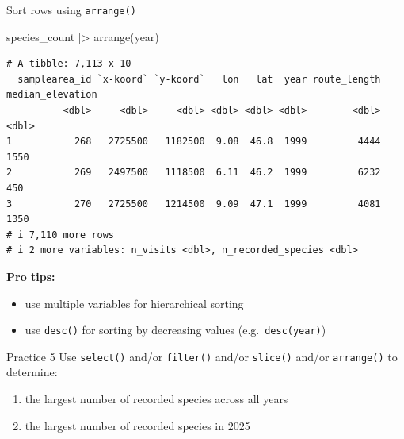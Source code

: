 \documentclass[
  ignorenonframetext,
  aspectratio=169,
]{beamer}
\newenvironment{Shaded}{\begin{snugshade}}{\end{snugshade}}
\newcommand{\FunctionTok}[1]{\textcolor[rgb]{0.28,0.35,0.67}{#1}}
\newcommand{\NormalTok}[1]{\textcolor[rgb]{0.00,0.23,0.31}{#1}}
\newcommand{\SpecialCharTok}[1]{\textcolor[rgb]{0.37,0.37,0.37}{#1}}
\providecommand{\tightlist}{%
  \setlength{\itemsep}{0pt}\setlength{\parskip}{0pt}}
\let\oldtexttt\texttt
\renewcommand{\texttt}[1]{\colorbox{gray!20}{\oldtexttt{#1}}}
\begin{document}
\begin{frame}[fragile]{Sort rows using \texttt{arrange()}}
\protect{}\label{sort-rows-using-arrange}
\footnotesize

\begin{Shaded}
\begin{Highlighting}[]
\NormalTok{species\_count }\SpecialCharTok{|\textgreater{}} \FunctionTok{arrange}\NormalTok{(year)}
\end{Highlighting}
\end{Shaded}

\begin{verbatim}
# A tibble: 7,113 x 10
  samplearea_id `x-koord` `y-koord`   lon   lat  year route_length median_elevation
          <dbl>     <dbl>     <dbl> <dbl> <dbl> <dbl>        <dbl>            <dbl>
1           268   2725500   1182500  9.08  46.8  1999         4444             1550
2           269   2497500   1118500  6.11  46.2  1999         6232              450
3           270   2725500   1214500  9.09  47.1  1999         4081             1350
# i 7,110 more rows
# i 2 more variables: n_visits <dbl>, n_recorded_species <dbl>
\end{verbatim}

\normalsize

\pause

\textbf{Pro tips:}

\begin{itemize}
\tightlist
\item
  use multiple variables for hierarchical sorting
\item
  use \texttt{desc()} for sorting by decreasing values
  (e.g.~\texttt{desc(year)})
\end{itemize}
\end{frame}

\begin{frame}[fragile]{Practice 5}
\protect{}\label{practice-5}
Use \texttt{select()} and/or \texttt{filter()} and/or \texttt{slice()}
and/or \texttt{arrange()} to determine:

\begin{enumerate}
\tightlist
\item
  the largest number of recorded species across all years
\item
  the largest number of recorded species in 2025
\end{enumerate}
\end{frame}
\end{document}
